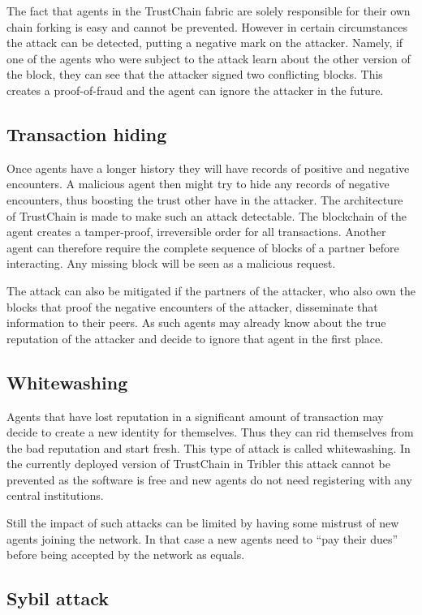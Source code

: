 The fact that agents in the TrustChain fabric are solely responsible for their own chain forking is
easy and cannot be prevented. However in certain circumstances the attack can be detected, putting a
negative mark on the attacker. Namely, if one of the agents who were subject to the attack learn 
about the other version of the block, they can see that the attacker signed two conflicting blocks.
This creates a proof-of-fraud and the agent can ignore the attacker in the future. 

\subsection{Transaction hiding}
Once agents have a longer history they will have records of positive and negative encounters. A 
malicious agent then might try to hide any records of negative encounters, thus boosting the trust 
other have in the attacker. The architecture of TrustChain is made to make such an attack detectable.
The blockchain of the agent creates a tamper-proof, irreversible order for all transactions. Another
agent can therefore require the complete sequence of blocks of a partner before interacting. Any 
missing block will be seen as a malicious request. 

The attack can also be mitigated if the partners of the attacker, who also own the blocks that proof
the negative encounters of the attacker, disseminate that information to their peers. As such agents
may already know about the true reputation of the attacker and decide to ignore that agent in the 
first place.

\subsection{Whitewashing}
Agents that have lost reputation in a significant amount of transaction may decide to create a new 
identity for themselves. Thus they can rid themselves from the bad reputation and start fresh. This 
type of attack is called whitewashing. In the currently deployed version of TrustChain in Tribler 
this attack cannot be prevented as the software is free and new agents do not need registering with
any central institutions.

Still the impact of such attacks can be limited by having some mistrust of new agents joining the 
network. In that case a new agents need to ``pay their dues'' before being accepted by the network 
as equals.

\subsection{Sybil attack}



